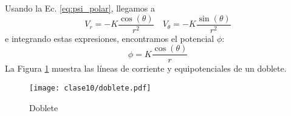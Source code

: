 Usando la Ec. \eqref{eq:psi_polar}, llegamos a
%
\begin{equation}
V_r = -K\frac{\cos(\theta)}{r^2}\quad V_\theta = -K\frac{\sin(\theta)}{r^2}
\end{equation}
%
e integrando estas expresiones, encontramos el potencial $\phi$:
%
\begin{equation}
\phi=K\frac{\cos(\theta)}{r}
\end{equation}
%
La Figura \ref{fig:doblete} muestra las líneas de corriente y equipotenciales de un doblete.
%
\begin{figure}[h!]
\centering
\texttt{[image: clase10/doblete.pdf]}
\caption{Doblete}
\label{fig:doblete}
\end{figure}
